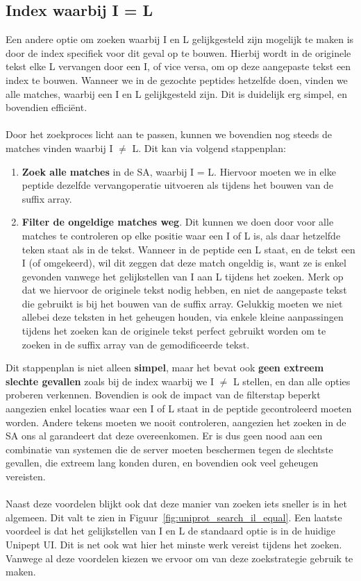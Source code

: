 \subsection{Index waarbij I = L}
Een andere optie om zoeken waarbij I en L gelijkgesteld zijn mogelijk te maken is door de index specifiek voor dit geval op te bouwen.
Hierbij wordt in de originele tekst elke L vervangen door een I, of vice versa, om op deze aangepaste tekst een index te bouwen.
Wanneer we in de gezochte peptides hetzelfde doen, vinden we alle matches, waarbij een I en L gelijkgesteld zijn.
Dit is duidelijk erg simpel, en bovendien efficiënt.
\\ \\
Door het zoekproces licht aan te passen, kunnen we bovendien nog steeds de matches vinden waarbij I $\neq$ L\@.
Dit kan via volgend stappenplan:
\begin{enumerate}
    \item \textbf{Zoek alle matches} in de SA, waarbij I = L\@.
    Hiervoor moeten we in elke peptide dezelfde vervangoperatie uitvoeren als tijdens het bouwen van de suffix array.
    \item \textbf{Filter de ongeldige matches weg}.
    Dit kunnen we doen door voor alle matches te controleren op elke positie waar een I of L is, als daar hetzelfde teken staat als in de tekst.
    Wanneer in de peptide een L staat, en de tekst een I (of omgekeerd), wil dit zeggen dat deze match ongeldig is, want ze is enkel gevonden vanwege het gelijkstellen van I aan L tijdens het zoeken.
    Merk op dat we hiervoor de originele tekst nodig hebben, en niet de aangepaste tekst die gebruikt is bij het bouwen van de suffix array.
    Gelukkig moeten we niet allebei deze teksten in het geheugen houden, via enkele kleine aanpassingen tijdens het zoeken kan de originele tekst perfect gebruikt worden om te zoeken in de suffix array van de gemodificeerde tekst.
\end{enumerate}

Dit stappenplan is niet alleen \textbf{simpel}, maar het bevat ook \textbf{geen extreem slechte gevallen} zoals bij de index waarbij we I $\neq$ L stellen, en dan alle opties proberen verkennen.
Bovendien is ook de impact van de filterstap beperkt aangezien enkel locaties waar een I of L staat in de peptide gecontroleerd moeten worden.
Andere tekens moeten we nooit controleren, aangezien het zoeken in de SA ons al garandeert dat deze overeenkomen.
Er is dus geen nood aan een combinatie van systemen die de server moeten beschermen tegen de slechtste gevallen, die extreem lang konden duren, en bovendien ook veel geheugen vereisten.
\\ \\
Naast deze voordelen blijkt ook dat deze manier van zoeken iets sneller is in het algemeen.
Dit valt te zien in Figuur~\ref{fig:uniprot_search_il_equal}.
Een laatste voordeel is dat het gelijkstellen van I en L de standaard optie is in de huidige Unipept UI\@.
Dit is net ook wat hier het minste werk vereist tijdens het zoeken.
Vanwege al deze voordelen kiezen we ervoor om van deze zoekstrategie gebruik te maken.


